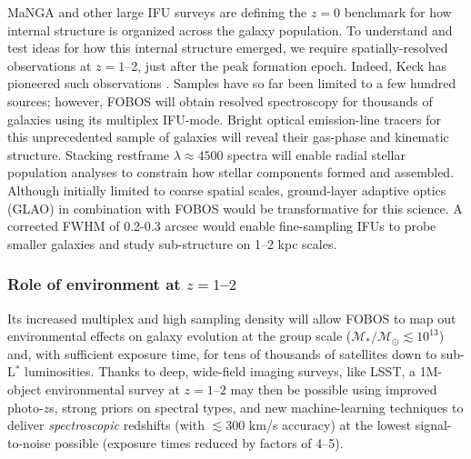 MaNGA \citep{bundy15} and other large IFU surveys are defining the
$z=0$ benchmark for how internal structure is organized across the
galaxy population. To understand and test ideas for how this internal
structure emerged, we require spatially-resolved observations at $z =
1$--2, just after the peak formation epoch. Indeed, Keck has
pioneered such observations \citep[e.g.,][]{erb04, miller11,law09}.
Samples have so far been limited to a few hundred sources; however,
FOBOS will obtain resolved spectroscopy for thousands of galaxies
using its multiplex IFU-mode. Bright optical emission-line tracers
for this unprecedented sample of galaxies will reveal their gas-phase
and kinematic structure. Stacking restframe $\lambda \approx 4500$
spectra will enable radial stellar population analyses to constrain
how stellar components formed and assembled. Although initially
limited to coarse spatial scales, ground-layer adaptive optics (GLAO)
in combination with FOBOS would be transformative for this science. A
corrected FWHM of 0.2-0.3 arcsec would enable fine-sampling IFUs to
probe smaller galaxies and study sub-structure on 1--2 kpc scales.

\subsubsection{Role of environment at $z=1$--$2$ }

Its increased multiplex and high sampling density will allow FOBOS to
map out environmental effects on galaxy evolution at the group scale
($\mathcal{M_\ast/M_\odot} \lesssim 10^{13}$) and, with sufficient
exposure time, for tens of thousands of satellites down to sub-L$^*$
luminosities. Thanks to deep, wide-field imaging surveys, like LSST,
a 1M-object environmental survey at $z=1$--$2$ may then be possible
using improved photo-$z$s, strong priors on spectral types, and new
machine-learning techniques to deliver {\it spectroscopic} redshifts
(with $\lesssim$300 km/s accuracy) at the lowest signal-to-noise
possible (exposure times reduced by factors of 4--5).



